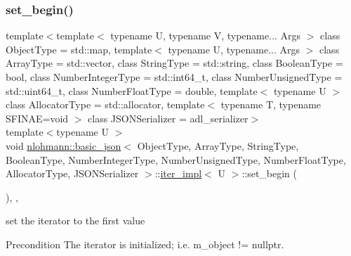 \subsubsection{\texorpdfstring{set\+\_\+begin()}{set\_begin()}}
{\footnotesize\ttfamily template$<$template$<$ typename U, typename V, typename... Args $>$ class Object\+Type = std\+::map, template$<$ typename U, typename... Args $>$ class Array\+Type = std\+::vector, class String\+Type  = std\+::string, class Boolean\+Type  = bool, class Number\+Integer\+Type  = std\+::int64\+\_\+t, class Number\+Unsigned\+Type  = std\+::uint64\+\_\+t, class Number\+Float\+Type  = double, template$<$ typename U $>$ class Allocator\+Type = std\+::allocator, template$<$ typename T, typename S\+F\+I\+N\+A\+E=void $>$ class J\+S\+O\+N\+Serializer = adl\+\_\+serializer$>$ \\
template$<$typename U $>$ \\
void \hyperlink{classnlohmann_1_1basic__json}{nlohmann\+::basic\+\_\+json}$<$ Object\+Type, Array\+Type, String\+Type, Boolean\+Type, Number\+Integer\+Type, Number\+Unsigned\+Type, Number\+Float\+Type, Allocator\+Type, J\+S\+O\+N\+Serializer $>$\+::\hyperlink{classnlohmann_1_1basic__json_1_1iter__impl}{iter\+\_\+impl}$<$ U $>$\+::set\+\_\+begin (\begin{DoxyParamCaption}{ }\end{DoxyParamCaption})\hspace{0.3cm}{\ttfamily [inline]}, {\ttfamily [private]}, {\ttfamily [noexcept]}}



set the iterator to the first value 

\begin{DoxyPrecond}{Precondition}
The iterator is initialized; i.\+e. {\ttfamily m\+\_\+object != nullptr}. 
\end{DoxyPrecond}
\mbox{\label{classnlohmann_1_1basic__json_1_1iter__impl_a18eb0144dc65b6387a9d8a0be7e9e05c}} 
